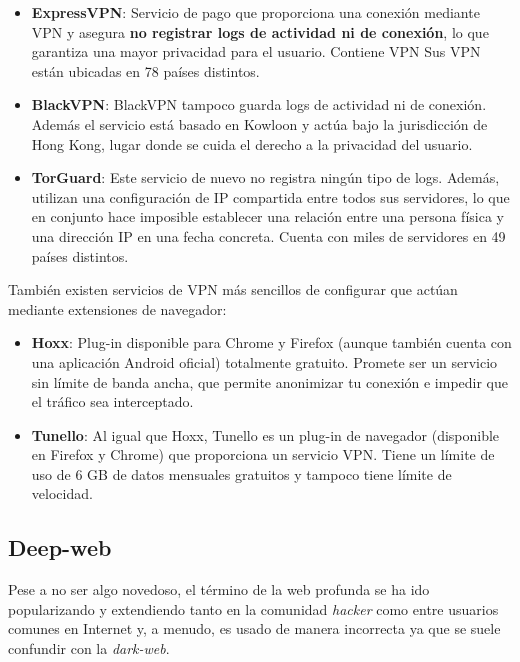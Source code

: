 	\begin{itemize}
		\item {\textbf{ExpressVPN}}: Servicio de pago que proporciona una conexión mediante VPN y asegura \textbf{no registrar logs de actividad ni de conexión}, lo que garantiza una mayor privacidad para el usuario. Contiene VPN  Sus VPN están ubicadas en 78 países distintos.
		\item {\textbf{BlackVPN}}: BlackVPN tampoco guarda logs de actividad ni de conexión. Además el servicio está basado en Kowloon y actúa bajo la jurisdicción de Hong Kong, lugar donde se cuida el derecho a la privacidad del usuario.
		\item {\textbf{TorGuard}}: Este servicio de nuevo no registra ningún tipo de logs. Además, utilizan una configuración de IP compartida entre todos sus servidores, lo que en conjunto hace imposible establecer una relación entre una persona física y una dirección IP en una fecha concreta. Cuenta con miles de servidores en 49 países distintos.
		
	\end{itemize}
	
	También existen servicios de VPN más sencillos de configurar que actúan mediante extensiones de navegador:
	
	\begin{itemize}
		\item {\textbf{Hoxx}}: Plug-in disponible para Chrome y Firefox (aunque también cuenta con una aplicación Android oficial) totalmente gratuito. Promete ser un servicio sin límite de banda ancha, que permite anonimizar tu conexión e impedir que el tráfico sea interceptado.
		\item {\textbf{Tunello}}: Al igual que Hoxx, Tunello es un plug-in de navegador (disponible en Firefox y Chrome) que proporciona un servicio VPN. Tiene un límite de uso de 6 GB de datos mensuales gratuitos y tampoco tiene límite de velocidad.	
	\end{itemize}

\subsection {Deep-web}
Pese a no ser algo novedoso, el término de la web profunda se ha ido popularizando y extendiendo tanto en la comunidad \textit{hacker} como entre usuarios comunes en Internet 	y, a menudo, es usado de manera incorrecta ya que se suele confundir con la \textit{dark-web}. 

